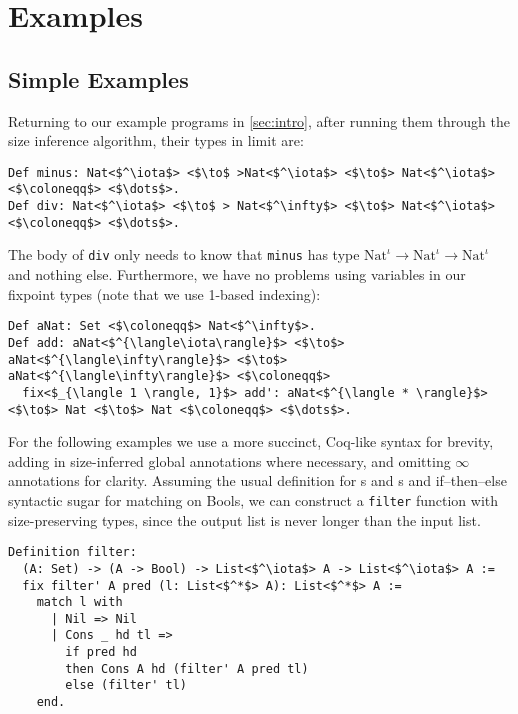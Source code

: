 \section{Examples}\label{sec:examples}

\subsection{Simple Examples}

Returning to our example programs in \autoref{sec:intro}, after running them through the size inference algorithm, their types in limit \lang are:

\begin{verbatim}
Def minus: Nat<$^\iota$> <$\to$ >Nat<$^\iota$> <$\to$> Nat<$^\iota$> <$\coloneqq$> <$\dots$>.
Def div: Nat<$^\iota$> <$\to$ > Nat<$^\infty$> <$\to$> Nat<$^\iota$> <$\coloneqq$> <$\dots$>.
\end{verbatim}

The body of \texttt{div} only needs to know that \texttt{minus} has type $\text{Nat}^\iota \to \text{Nat}^\iota \to \text{Nat}^\iota$ and nothing else.
Furthermore, we have no problems using variables in our fixpoint types (note that we use 1-based indexing):

\begin{verbatim}
Def aNat: Set <$\coloneqq$> Nat<$^\infty$>.
Def add: aNat<$^{\langle\iota\rangle}$> <$\to$> aNat<$^{\langle\infty\rangle}$> <$\to$> aNat<$^{\langle\infty\rangle}$> <$\coloneqq$>
  fix<$_{\langle 1 \rangle, 1}$> add': aNat<$^{\langle * \rangle}$> <$\to$> Nat <$\to$> Nat <$\coloneqq$> <$\dots$>.
\end{verbatim}

For the following examples we use a more succinct, Coq-like syntax for brevity, adding in size-inferred global annotations where necessary, and omitting $\infty$ annotations for clarity.
Assuming the usual definition for s and s and if--then--else syntactic sugar for matching on Bools, we can construct a \texttt{filter} function with size-preserving types, since the output list is never longer than the input list.

\begin{verbatim}
Definition filter:
  (A: Set) -> (A -> Bool) -> List<$^\iota$> A -> List<$^\iota$> A :=
  fix filter' A pred (l: List<$^*$> A): List<$^*$> A :=
    match l with
      | Nil => Nil
      | Cons _ hd tl =>
        if pred hd
        then Cons A hd (filter' A pred tl)
        else (filter' tl)
    end.
\end{verbatim}

